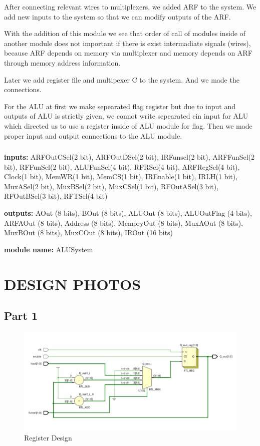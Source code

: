 \documentclass[pdftex,12pt,a4paper]{article}
\begin{document}
	After connecting relevant wires to multiplexers, we added ARF to the system.
	We add new inputs to the system so that we can modify outputs of the ARF.

	With the addition of this module we see that order of call of modules inside of another 
	module does not important if there is exist intermadiate signals (wires), because
	ARF depends on memory via multiplexer and memory depends on ARF through memory
	 address information.

	 Later we add register file and multipexer C to the system. And we made the connections.

	For the ALU at first we make sepearated flag register but due to input and outputs of ALU 
	is strictly given, we connot write sepearated cin input for ALU which directed us to use a register
	inside of ALU module for flag. Then we made proper input and output connections to the ALU
	module.

	

	\subsubsection{}
	\textbf{inputs:}
	ARFOutCSel(2 bit), ARFOutDSel(2 bit), IRFunsel(2 bit), ARFFunSel(2 bit),
	RFFunSel(2 bit), ALUFunSel(4 bit), RFRSel(4 bit), ARFRegSel(4 bit),
	Clock(1 bit), MemWR(1 bit), MemCS(1 bit), IREnable(1 bit),
	IRLH(1 bit), MuxASel(2 bit), MuxBSel(2 bit), MuxCSel(1 bit),
	RFOutASel(3 bit), RFOutBSel(3 bit), RFTSel(4 bit)


	\textbf{outputs:} 
	AOut (8 bits),
    BOut (8 bits),
    ALUOut (8 bits),
    ALUOutFlag (4 bits),
    ARFAOut (8 bits),
    Address (8 bits),
    MemoryOut (8 bits), 
    MuxAOut (8 bits), 
    MuxBOut (8 bits),
    MuxCOut (8 bits),
    IROut (16 bits)

	\textbf{module name:} ALUSystem







\section{DESIGN PHOTOS}
\subsection{Part 1}
\begin{figure}[H]
	\centering
	\includegraphics[width=1\textwidth]{design/register.png}	
	\caption{Register Design}
	\label{Register Design}
\end{figure}
\end{document}

